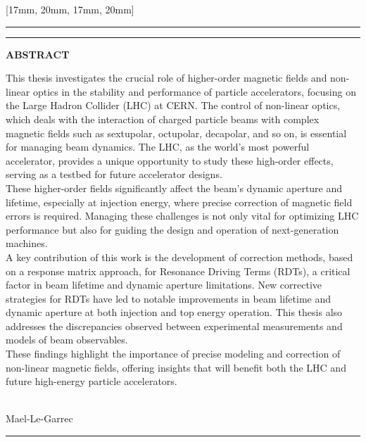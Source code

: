 \documentclass[coverheight=240mm,
               coverwidth=175mm, 
               spinewidth=15mm,
               markcolor=black,
               bleedwidth=0mm,
               marklength=0mm]{bookcover}
\begin{document}
\begin{bookcover}
[17mm, 20mm, 17mm, 20mm]{
    \noindent\rule[0.5em]{\partwidth}{1.5pt}\vspace{-4pt}
    \noindent\rule[0.5em]{\partwidth}{1.5pt}
    \vspace{1cm}

    {\centering\bfseries\Large ABSTRACT\\[10mm]}%

    {
    \fontsize{11pt}{11pt}\selectfont
    This thesis investigates the crucial role of higher-order magnetic fields and non-linear optics in
    the stability and performance of particle accelerators, focusing on the Large Hadron Collider (LHC)
    at CERN. The control of non-linear optics, which deals with the interaction of charged particle 
    beams with complex magnetic fields such as sextupolar, octupolar, decapolar, and so on, is essential
    for managing beam dynamics. The LHC, as the world's most powerful accelerator, provides a unique
    opportunity to study these high-order effects, serving as a testbed for future accelerator designs.
    \\

    These higher-order fields significantly affect the beam's dynamic aperture and lifetime, especially
    at injection energy, where precise correction of magnetic field errors is required. Managing these
    challenges is not only vital for optimizing LHC performance but also for guiding the design and
    operation of next-generation machines.
    \\

    A key contribution of this work is the development of correction methods, based on a response matrix
    approach, for Resonance Driving Terms (RDTs), a critical factor in beam lifetime and dynamic
    aperture limitations. New corrective strategies for RDTs have led to notable improvements in beam
    lifetime and dynamic aperture at both injection and top energy operation. This thesis also addresses
    the discrepancies observed between experimental measurements and models of beam observables.
    \\

    These findings highlight the importance of precise modeling and correction of non-linear magnetic
    fields, offering insights that will benefit both the LHC and future high-energy particle
    accelerators.

    }

    \vfill

    \centering
    \\[3mm]
     Mael-Le-Garrec

    \vspace{1cm}

    \noindent\rule[0.5em]{\partwidth}{1.5pt}%
}

\end{bookcover}
\end{document}
